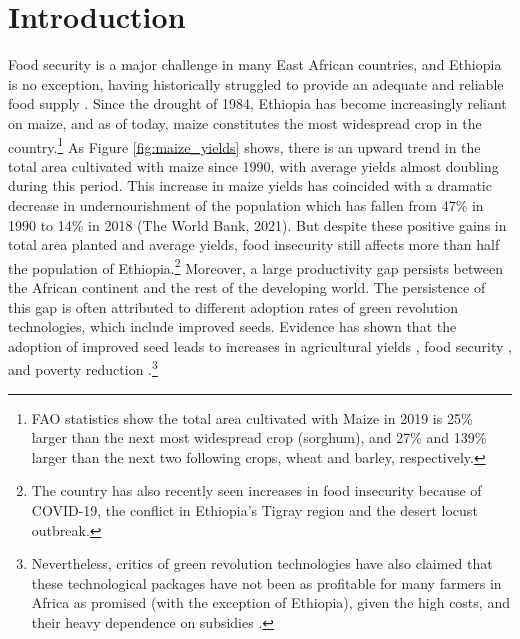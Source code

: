 \documentclass[11pt]{article}
\begin{document}
\section{Introduction}

Food security is a major challenge in many East African countries, and Ethiopia is no exception, having historically struggled to provide an adequate and reliable food supply \citep{Ramakrishna2002-hv, Jaleta2018-oj}. Since the drought of 1984, Ethiopia has become increasingly reliant on maize, and as of today, maize constitutes the most widespread crop in the country.\footnote{FAO statistics show the total area cultivated with Maize in 2019 is 25\% larger than the next most widespread crop (sorghum), and 27\% and 139\% larger than the next two following crops, wheat and barley, respectively.} As Figure \ref{fig:maize_yields} shows, there is an upward trend in the total area cultivated with maize since 1990, with average yields almost doubling during this period. This increase in maize yields has coincided with a dramatic decrease in undernourishment of the population which has fallen from 47\% in 1990 to 14\% in 2018 (The World Bank, 2021). But despite these positive gains in total area planted and average yields, food insecurity still affects more than half the population of Ethiopia.\footnote{The country has also recently seen increases in food insecurity because of COVID-19, the conflict in Ethiopia’s Tigray region and the desert locust outbreak.} Moreover, a large productivity gap persists between the African continent and the rest of the developing world. The persistence of this gap is often attributed to different adoption rates of green revolution technologies, which include improved seeds. Evidence has shown that the adoption of improved seed leads to increases in agricultural yields \citep{Carter2014-fm}, food security \citep{Shiferaw2014-op}, and poverty reduction \citep{Minten2008-tj}.\footnote{Nevertheless, critics of green revolution technologies have also claimed that these technological packages have not been as profitable for many farmers in Africa as promised (with the exception of Ethiopia), given the high costs, and their heavy dependence on subsidies \citep{Wise20}.} 
\end{document}
